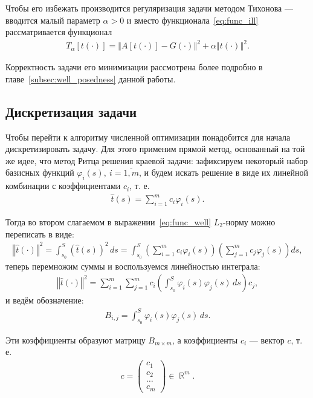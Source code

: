 \documentclass[a4paper,14pt]{extarticle}
\DeclareMathOperator{\RR}{\mathbb{R}}
\newcommand{\norm}[1]{\left\Vert #1 \right\Vert}
\begin{document}
    Чтобы его избежать производится регуляризация задачи методом Тихонова --- вводится малый параметр $\alpha > 0$ и вместо функционала~\eqref{eq:func_ill} рассматривается функционал
    \begin{gather}
        \label{eq:func_well}
        T_{\alpha}[t(\cdot)] = \norm{A[t(\cdot)] - G(\cdot)}^2
        + \alpha \norm{t(\cdot)}^2.
    \end{gather}

    Корректность задачи его минимизации рассмотрена более подробно
    в главе~\ref{subsec:well_posedness} данной работы.

    \subsection{Дискретизация задачи}

    Чтобы перейти к алгоритму численной оптимизации понадобится для начала дискретизировать задачу. Для этого применим прямой метод, основанный на той же идее, что метод Ритца решения краевой задачи: зафиксируем некоторый набор базисных функций $\varphi_i(s), \ i = \overline{1, m}$, и будем искать решение в виде их линейной комбинации с коэффициентами $c_i$, т. е.
    \begin{gather*}
        \hat{t}(s) = \sum_{i = 1}^m c_i \varphi_i(s).
    \end{gather*}

    Тогда во втором слагаемом в выражении~\eqref{eq:func_well} $L_2$-норму можно переписать в виде:
    \begin{gather*}
        \norm{\hat{t}(\cdot)}^2
        = \int_{s_0}^S (\hat{t}(s))^2 \, ds
        = \int_{s_0}^S \left(
        \sum_{i = 1}^m c_i \varphi_i(s)
        \right)
        \left(
        \sum_{j = 1}^m c_{j} \varphi_{j}(s)
        \right)
        ds,
    \end{gather*}
    теперь перемножим суммы и воспользуемся линейностью интеграла:
    \begin{gather*}
        \norm{\hat{t}(\cdot)}^2
        = \sum_{i = 1}^m \sum_{j = 1}^m
        c_i \left(
        \int_{s_0}^S \varphi_i(s) \varphi_{j}(s) \, ds
        \right) c_{j},
    \end{gather*}
    и ведём обозначение:
    \begin{gather*}
        B_{i, j}
        = \int_{s_0}^S \varphi_i(s) \varphi_{j}(s) \, ds.
    \end{gather*}

    Эти коэффициенты образуют матрицу $B_{m \times m} $, а коэффициенты $c_i$ --- вектор $c$, т. е.
    \begin{gather*}
        c =
        \begin{pmatrix}
            c_1 \\
            c_2 \\
            \ldots \\
            c_m
        \end{pmatrix}
        \in \RR^m.
    \end{gather*}
\end{document}
